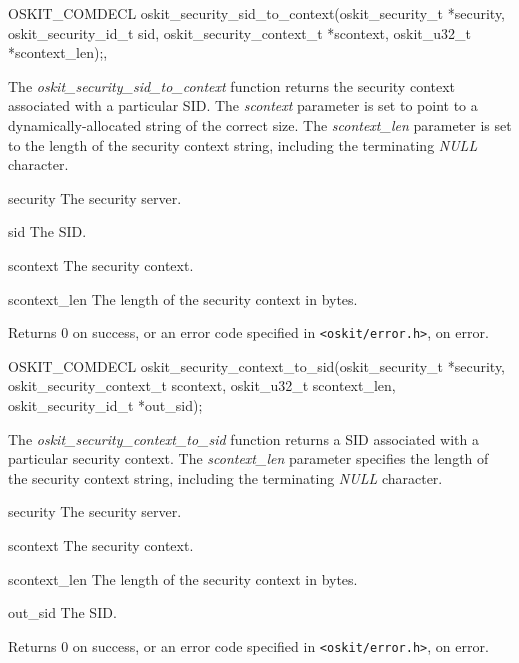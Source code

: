 \begin{apisyn}

	\funcproto OSKIT_COMDECL
	oskit_security_sid_to_context(oskit_security_t *security, 
		          oskit_security_id_t sid,
			  \outparam oskit_security_context_t *scontext,
                          \outparam oskit_u32_t *scontext_len);,
\end{apisyn}
\begin{apidesc}

The \emph{oskit\_security\_sid\_to\_context} function returns the security
context associated with a particular SID\@.  The \emph{scontext} parameter is set to point to a dynamically-allocated string of the correct size.  The
\emph{scontext\_len} parameter is set to the length of the security
context string, including the terminating \emph{NULL} character.  

\end{apidesc}
\begin{apiparm}
	\item[security]
		The security server.
	\item[sid]
		The SID.
	\item[scontext]
		The security context.
	\item[scontext_len]
		The length of the security context in bytes.
\end{apiparm}
\begin{apiret}
	Returns 0 on success, or an error code specified in
	{\tt <oskit/error.h>}, on error.
\end{apiret}


\begin{apisyn}

	\funcproto OSKIT_COMDECL
	oskit_security_context_to_sid(oskit_security_t *security, 
			  oskit_security_context_t scontext,
                          oskit_u32_t scontext_len,
			  \outparam  oskit_security_id_t *out_sid);

\end{apisyn}
\begin{apidesc}

The \emph{oskit\_security\_context\_to\_sid} function returns a SID
associated with a particular security context.  The
\emph{scontext\_len} parameter specifies the length of the security
context string, including the terminating \emph{NULL} character.

\end{apidesc}
\begin{apiparm}
	\item[security]
		The security server.
	\item[scontext]
		The security context.
	\item[scontext_len]
		The length of the security context in bytes.
	\item[out_sid]
		The SID.
\end{apiparm}
\begin{apiret}
	Returns 0 on success, or an error code specified in
	{\tt <oskit/error.h>}, on error.
\end{apiret}


